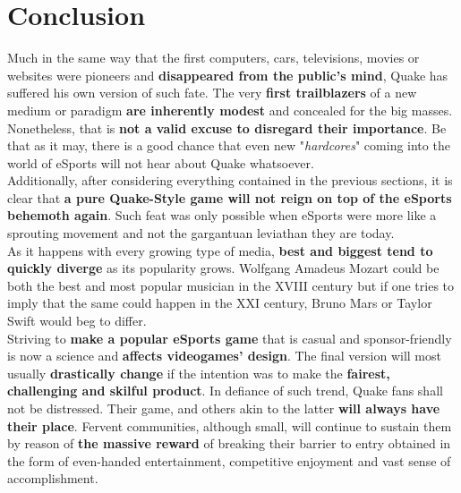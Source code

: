 \section{Conclusion}
\label{sec:conclusion}

Much in the same way that the first computers, cars, televisions, movies or websites were pioneers and \textbf{disappeared from the public's mind}, Quake has suffered his own version of such fate. The very \textbf{first trailblazers} of a new medium or paradigm \textbf{are inherently modest} and concealed for the big masses. Nonetheless, that is \textbf{not a valid excuse to disregard their importance}. Be that as it may, there is a good chance that even new "\textit{hardcores}" coming into the world of eSports will not hear about Quake whatsoever.\\

Additionally, after considering everything contained in the previous sections, it is clear that \textbf{a pure Quake-Style game will not reign on top of the eSports behemoth again}. Such feat was only possible when eSports were more like a sprouting movement and not the gargantuan leviathan they are today.\\

As it happens with every growing type of media, \textbf{best and biggest tend to quickly diverge} as its popularity grows. Wolfgang Amadeus Mozart could be both the best and most popular musician in the XVIII century but if one tries to imply that the same could happen in the XXI century, Bruno Mars or Taylor Swift would beg to differ.\\

Striving to \textbf{make a popular eSports game} that is casual and sponsor-friendly is now a science and \textbf{affects videogames' design}. The final version will most usually \textbf{drastically change} if the intention was to make the \textbf{fairest, challenging and skilful product}. In defiance of such trend, Quake fans shall not be distressed. Their game, and others akin to the latter \textbf{will always have their place}. Fervent communities, although small, will continue to sustain them by reason of \textbf{the massive reward} of breaking their barrier to entry obtained in the form of even-handed entertainment, competitive enjoyment and vast sense of accomplishment.\\